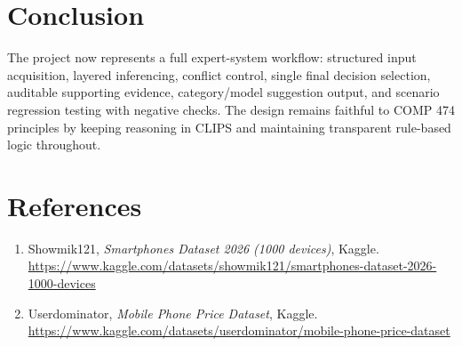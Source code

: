 \documentclass[11pt]{article}
\begin{document}
\section{Conclusion}
The project now represents a full expert-system workflow: structured input acquisition, layered inferencing, conflict control, single final decision selection, auditable supporting evidence, category/model suggestion output, and scenario regression testing with negative checks. The design remains faithful to COMP 474 principles by keeping reasoning in CLIPS and maintaining transparent rule-based logic throughout.

\section*{References}
\begin{enumerate}
  \item Showmik121, \emph{Smartphones Dataset 2026 (1000 devices)}, Kaggle.\\
  \url{https://www.kaggle.com/datasets/showmik121/smartphones-dataset-2026-1000-devices}

  \item Userdominator, \emph{Mobile Phone Price Dataset}, Kaggle.\\
  \url{https://www.kaggle.com/datasets/userdominator/mobile-phone-price-dataset}
\end{enumerate}
\end{document}
